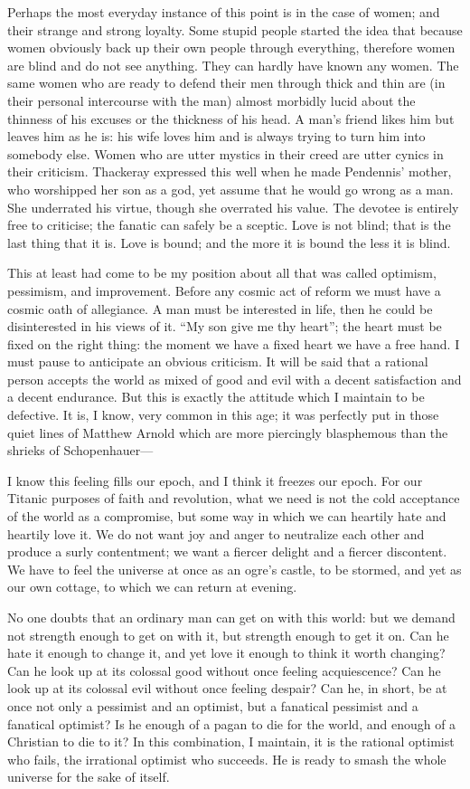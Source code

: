 Perhaps the most everyday instance of this point is in the case of women; and their strange and strong loyalty. Some stupid people started the idea that because women obviously back up their own people through everything, therefore women are blind and do not see anything. They can hardly have known any women. The same women who are ready to defend their men through thick and thin are (in their personal intercourse with the man) almost morbidly lucid about the thinness of his excuses or the thickness of his head. A man’s friend likes him but leaves him as he is: his wife loves him and is always trying to turn him into somebody else. Women who are utter mystics in their creed are utter cynics in their criticism. Thackeray expressed this well when he made Pendennis’ mother, who worshipped her son as a god, yet assume that he would go wrong as a man. She underrated his virtue, though she overrated his value. The devotee is entirely free to criticise; the fanatic can safely be a sceptic. Love is not blind; that is the last thing that it is. Love is bound; and the more it is bound the less it is blind.

This at least had come to be my position about all that was called optimism, pessimism, and improvement. Before any cosmic act of reform we must have a cosmic oath of allegiance. A man must be interested in life, then he could be disinterested in his views of it. “My son give me thy heart”; the heart must be fixed on the right thing: the moment we have a fixed heart we have a free hand. I must pause to anticipate an obvious criticism. It will be said that a rational person accepts the world as mixed of good and evil with a decent satisfaction and a decent endurance. But this is exactly the attitude which I maintain to be defective. It is, I know, very common in this age; it was perfectly put in those quiet lines of Matthew Arnold which are more piercingly blasphemous than the shrieks of Schopenhauer—

I know this feeling fills our epoch, and I think it freezes our epoch. For our Titanic purposes of faith and revolution, what we need is not the cold acceptance of the world as a compromise, but some way in which we can heartily hate and heartily love it. We do not want joy and anger to neutralize each other and produce a surly contentment; we want a fiercer delight and a fiercer discontent. We have to feel the universe at once as an ogre’s castle, to be stormed, and yet as our own cottage, to which we can return at evening.

No one doubts that an ordinary man can get on with this world: but we demand not strength enough to get on with it, but strength enough to get it on. Can he hate it enough to change it, and yet love it enough to think it worth changing? Can he look up at its colossal good without once feeling acquiescence? Can he look up at its colossal evil without once feeling despair? Can he, in short, be at once not only a pessimist and an optimist, but a fanatical pessimist and a fanatical optimist? Is he enough of a pagan to die for the world, and enough of a Christian to die to it? In this combination, I maintain, it is the rational optimist who fails, the irrational optimist who succeeds. He is ready to smash the whole universe for the sake of itself.

